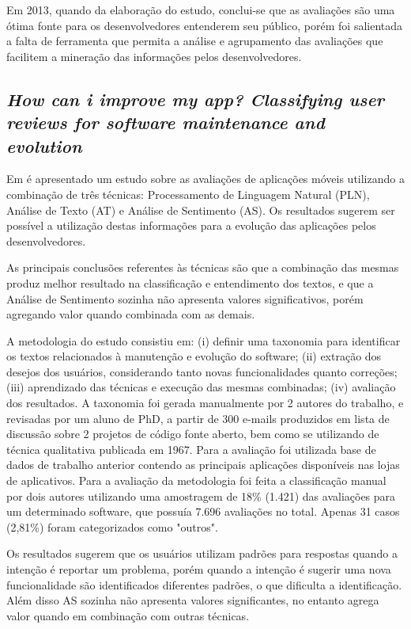 Em 2013, quando da elaboração do estudo, conclui-se que as avaliações são uma ótima fonte para os desenvolvedores entenderem seu público, porém foi salientada a falta de ferramenta que permita a análise e agrupamento das avaliações que facilitem a mineração das informações pelos desenvolvedores.


\subsection{\textit{How can i improve my app? Classifying user reviews for software maintenance and evolution}}
Em \cite{Panichella2015how} é apresentado um estudo sobre as avaliações de aplicações móveis utilizando a combinação de três técnicas: Processamento de Linguagem Natural (PLN), Análise de Texto (AT) e Análise de Sentimento (AS). Os resultados sugerem ser possível a utilização destas informações para a evolução das aplicações pelos desenvolvedores.

As principais conclusões referentes às técnicas são que a combinação das mesmas produz melhor resultado na classificação e entendimento dos textos, e que a Análise de Sentimento sozinha não apresenta valores significativos, porém agregando valor quando combinada com as demais.

A metodologia do estudo consistiu em: (i) definir uma taxonomia para identificar os textos relacionados à manutenção e evolução do software; (ii) extração dos desejos dos usuários, considerando tanto novas funcionalidades quanto correções; (iii) aprendizado das técnicas e execução das mesmas combinadas; (iv) avaliação dos resultados.
A taxonomia foi gerada manualmente por 2 autores do trabalho, e revisadas por um aluno de PhD, a partir de 300 e-mails produzidos em lista de discussão sobre 2 projetos de código fonte aberto, bem como se utilizando de técnica qualitativa publicada em 1967. Para a avaliação foi utilizada base de dados de trabalho anterior contendo as principais aplicações disponíveis nas lojas de aplicativos. Para a avaliação da metodologia foi feita a classificação manual por dois autores utilizando uma amostragem de 18\% (1.421) das avaliações para um determinado software, que possuía 7.696 avaliações no total. Apenas 31 casos (2,81\%) foram categorizados como "outros".

Os resultados sugerem que os usuários utilizam padrões para respostas quando a intenção é reportar um problema, porém quando a intenção é sugerir uma nova funcionalidade são identificados diferentes padrões, o que dificulta a identificação. Além disso AS sozinha não apresenta valores significantes, no entanto agrega valor quando em combinação com outras técnicas.

